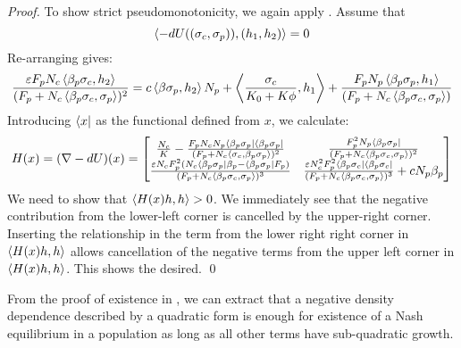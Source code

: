 \begin{proof}
  To show strict pseudomonotonicity, we again apply . Assume that
  \begin{equation}
    \left \langle -dU((\sigma_c,\sigma_p)),(h_1, h_2) \right \rangle = 0
  \end{equation}
  Re-arranging gives:
  \begin{equation}
    \label{eq:h1_h2_rel}
    \frac{\epsilon F_p N_c \ip{\beta_p \sigma_c}{h_2}}{(F_p + N_c\ip{\beta_p \sigma_c}{\sigma_p})^2} = c\ip{\beta \sigma_p}{h_2}N_p + \ip{\frac{\sigma_c}{K_0 + K \phi}}{h_1} + \frac{F_p N_p \ip{\beta_p \sigma_p}{h_1}}{(F_p + N_c\ip{\beta_p \sigma_c}{\sigma_p})}
  \end{equation}
  Introducing $\langle x \rvert$ as the functional defined from $x$, we calculate:
  \begin{equation}
    \label{eq:hess_mat}
    H(x) = (\nabla -dU)(x) =
    \begin{bmatrix}
      \frac{N_c}{K} - \frac{F_p N_c N_p \langle \beta_p \sigma_p \rvert \langle \beta_p \sigma_p \rvert}{(F_p + N_c \left \langle \sigma_c,\beta_p \sigma_p \right \rangle)^2} & \frac{F_p^2 N_p \langle \beta_p \sigma_p \rvert}{(F_p + N_c \left \langle \beta_p\sigma_c,\sigma_p \right \rangle)^2} \\
      \frac{\varepsilon N_cF_p^2 (N_c \langle \beta_p \sigma_p \rvert \beta_p - \langle \beta_p \sigma_p \rvert F_p)}{(F_p + N_c \left \langle \beta_p \sigma_c,\sigma_p \right \rangle)^3} & \frac{\varepsilon N_c^2 F_p^2 \langle \beta_p \sigma_c \rvert \langle \beta_p \sigma_c \rvert}{(F_p + N_c \left \langle \beta_p \sigma_c,\sigma_p \right \rangle)^3}+c N_p \beta_p
    \end{bmatrix}
  \end{equation}
  We need to show that $\left \langle H(x)h,h \right \rangle>0$. We immediately see that the negative contribution from the lower-left corner is cancelled by the upper-right corner. Inserting the relationship  in the term from the lower right right corner in $\left \langle H(x)h,h \right \rangle$ allows cancellation of the negative terms from the upper left corner in $\left \langle H(x)h,h \right \rangle$. This shows the desired. %
  \qed
\end{proof}
\begin{remark}
  From the proof of existence in , we can extract that a negative density dependence described by a quadratic form is enough for existence of a Nash equilibrium in a population as long as all other terms have sub-quadratic growth.
\end{remark}

